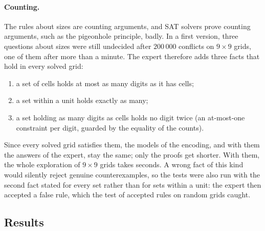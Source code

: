 \documentclass[11pt,a4paper]{article}
\theoremstyle{definition}
\theoremstyle{remark}
\begin{document}
\paragraph{Counting.} The rules about sizes are counting arguments, and SAT solvers prove counting arguments, such as the pigeonhole principle, badly. In a first version, three questions about sizes were still undecided after $200\,000$ conflicts on $9 \times 9$ grids, one of them after more than a minute. The expert therefore adds three facts that hold in every solved grid:
\begin{enumerate}
  \item a set of cells holds at most as many digits as it has cells;
  \item a set within a unit holds exactly as many;
  \item a set holding as many digits as cells holds no digit twice (an at-most-one constraint per digit, guarded by the equality of the counts).
\end{enumerate}
Since every solved grid satisfies them, the models of the encoding, and with them the answers of the expert, stay the same; only the proofs get shorter. With them, the whole exploration of $9 \times 9$ grids takes seconds. A wrong fact of this kind would silently reject genuine counterexamples, so the tests were also run with the second fact stated for every set rather than for sets within a unit: the expert then accepted a false rule, which the test of accepted rules on random grids caught.

\subsection{Results}\label{sec:sets-results}
\end{document}
